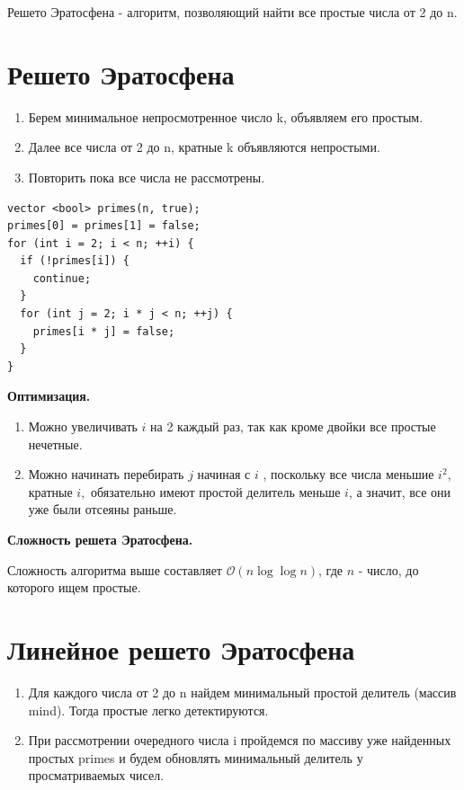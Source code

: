 \Def Решето Эратосфена - алгоритм, позволяющий найти все простые числа от 2 до n.

\section*{Решето Эратосфена}

\Alg 
\begin{enumerate}
    \item Берем минимальное непросмотренное число k, объявляем его простым.
    \item Далее все числа от 2 до n, кратные k объявляются непростыми.
    \item Повторить пока все числа не рассмотрены.
\end{enumerate}

\begin{lstlisting}
vector <bool> primes(n, true);  
primes[0] = primes[1] = false;
for (int i = 2; i < n; ++i) {
  if (!primes[i]) {
    continue;
  }
  for (int j = 2; i * j < n; ++j) {  
    primes[i * j] = false;  
  }
}
\end{lstlisting}

\textbf{Оптимизация.}
\begin{enumerate}
    \item Можно увеличивать $i$ на 2 каждый раз, так как кроме двойки все простые нечетные.
    \item Можно начинать перебирать $j$ начиная с $i$ , поскольку все числа меньшие $i^2$, кратные $i,$ обязательно имеют простой делитель меньше $i$, а значит, все они уже были отсеяны раньше.
\end{enumerate}

\textbf{Сложность решета Эратосфена.}


\Thbd Сложность алгоритма выше составляет $\mathcal{O}(n\log\log n)$, где $n$ - число, до которого ищем простые.

\section*{Линейное решето Эратосфена}

\Alg 
\begin{enumerate}
    \item Для каждого числа от 2 до n найдем минимальный простой делитель (массив mind). Тогда простые легко детектируются.
    \item При рассмотрении очередного числа i пройдемся по массиву уже найденных простых primes и будем обновлять минимальный делитель у просматриваемых чисел.
\end{enumerate}

